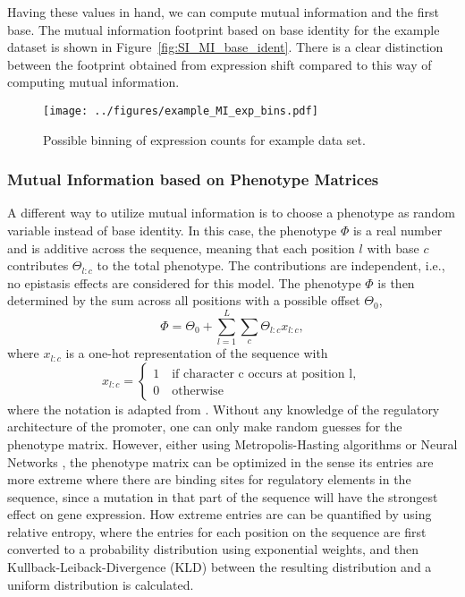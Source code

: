 Having these values in hand, we can compute mutual information and the first base. The mutual information footprint based on base identity for the example dataset is shown in Figure~\ref{fig:SI_MI_base_ident}. There is a clear distinction between the footprint obtained from expression shift compared to this way of computing mutual information. 
\fi
\begin{figure}
    \texttt{[image: ../figures/example\_MI\_exp\_bins.pdf]}
    \caption{Possible binning of expression counts for example data set. }
    \label{fig:SI_MI_exp_bins}
\end{figure}
\subsubsection{Mutual Information based on Phenotype Matrices}
A different way to utilize mutual information is to choose a phenotype as random variable instead of base identity. In this case, the phenotype $\Phi$ is a real number and is additive across the sequence, meaning that each position $l$ with base $c$ contributes $\Theta_{l:c}$ to the total phenotype. The contributions are independent, i.e., no epistasis effects are considered for this model. The phenotype $\Phi$ is then determined by the sum across all positions with a possible offset $\Theta_0$,
\begin{equation}
    \Phi = \Theta_0 + \sum_{l=1}^{L}\sum_c \Theta_{l:c}x_{l:c},
\end{equation}
where $x_{l:c}$ is a one-hot representation of the sequence with
\begin{equation}
    x_{l:c}=\begin{cases}
        1\quad\text{if character c occurs at position l},\\
        0\quad\text{otherwise}
    \end{cases}
\end{equation}
where the notation is adapted from \cite{tareen2022mave}. Without any knowledge of the regulatory architecture of the promoter, one can only make random guesses for the phenotype matrix. However, either using Metropolis-Hasting algorithms  or Neural Networks , the phenotype matrix can be optimized in the sense its entries are more extreme where there are binding sites for regulatory elements in the sequence, since a mutation in that part of the sequence will have the strongest effect on gene expression. How extreme entries are can be quantified by using relative entropy, where the entries for each position on the sequence are first converted to a probability distribution using exponential weights, and then Kullback-Leiback-Divergence (KLD) between the resulting distribution and a uniform distribution is calculated. 
 
